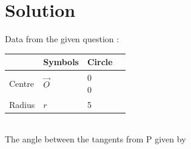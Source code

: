 \documentclass[journal,12pt,twocolumn]{IEEEtran}
\begin{document}
\section{Solution}
Data from the given question :
\begin{table}[!ht]
\begin{center}
\begin{tabular}{ | m{2cm} | m{1.5cm}| m{2cm} | m{1.5cm} |} 
\hline
& Symbols & Circle \\
\hline
Centre & $\vec{O}$ & \myvec{0\\0} \\ 
\hline
Radius & $r$ & 5\\ 
\hline
\end{tabular}
\end{center}
\end{table}
\\
The angle between the tangents from P given by \degree
\end{document}
